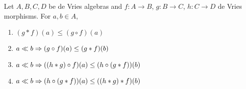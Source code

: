 \begin{proposition}
	Let \( A,B,C,D \) be de Vries algebras and \( f:A \to B \), \( g:B \to C \), \( h:C \to D \) de Vries morphisms.  For \( a,b \in A \),
	\begin{enumerate}[label={(\arabic*)},ref={\theproposition(\arabic*)}]
		\item \label{mastleqcirc}
			\( (g \ast f)(a) \leq (g \circ f)(a) \)
		\item \label{mdevcircleqast}
			\( a \ll b \Rightarrow (g \circ f)(a) \leq (g \ast f)(b) \)
		\item \label{mdevcompflip}
			\( a \ll b \Rightarrow ((h \ast g) \circ f)(a) \leq (h \circ (g \ast f))(b) \)
		\item \label{mdevcircleqastcomp}
			\( a \ll b \Rightarrow (h \circ (g \ast f))(a) \leq ((h \ast g) \ast f)(b) \)
	\end{enumerate}
\end{proposition}

